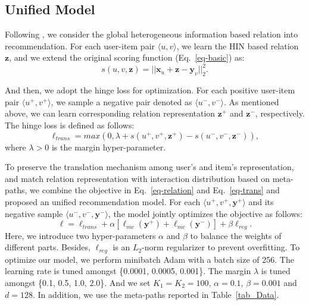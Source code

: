 \subsection{Unified Model}
Following \cite{tay2018latent}, we consider the global heterogeneous information based relation into recommendation. For each user-item pair $\langle u, v\rangle$, we learn the HIN based relation $\bm{z}$, and we extend the original scoring function (Eq.~\ref{eq-basic}) as:
\begin{equation}
s(u, v, \bm{z}) = ||\bm{x}_u + \bm{z} - \bm{y}_v||_2^2.
\end{equation}

And then, we adopt the hinge loss for optimization. For each positive user-item pair $\langle u^+, v^+\rangle$, we sample a negative pair denoted as $\langle u^-, v^-\rangle$. As mentioned above, we can learn corresponding relation representation $\bm{z}^+$ and $\bm{z}^-$, respectively. The hinge loss is defined as follows:
\begin{equation}
\label{eq-trans}
\ell_{trans} = max(0, \lambda + s(u^+, v^+, \bm{z}^+) - s(u^-, v^-, \bm{z}^-)),
\end{equation}
where $\lambda > 0$ is the margin hyper-parameter.

To preserve the translation mechanism among user's and item's representation, and match relation representation with interaction distribution based on meta-paths, we combine the objective in Eq.~\ref{eq-relation} and Eq.~\ref{eq-trans} and proposed an unified recommendation model. For each $\langle u^+, v^+, \bm{y}^+\rangle$ and its negative sample $\langle u^-, v^-, \bm{y}^-\rangle$, the model jointly optimizes the objective as follows:
\begin{equation}
\ell = \ell_{trans} + \alpha[\ell_{mc}(\bm{y}^+) + \ell_{mc}(\bm{y}^-)] + \beta\ell_{reg}.
\end{equation}
Here, we introduce two hyper-parameters $\alpha$ and $\beta$ to balance the weights of different parts. Besides, $\ell_{reg}$ is an $L_2$-norm regularizer to prevent overfitting. To optimize our model, we perform minibatch
Adam with a batch size of 256. The learning rate is tuned amongst \{0.0001, 0.0005, 0.001\}. The margin $\lambda$ is tuned amongst \{0.1, 0.5, 1.0, 2.0\}. And we set $K_1 = K_2 = 100$, $\alpha = 0.1$, $\beta = 0.001$ and $d = 128$. In addition, we use the meta-paths reported in Table~\ref{tab_Data}.
